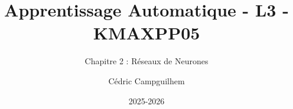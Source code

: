 \documentclass[10pt,handout]{beamer}  %
\title{Apprentissage Automatique - L3 - KMAXPP05}
\subtitle{Chapitre 2 : Réseaux de Neurones}
\author{Cédric Campguilhem}
\institute[]{
	Airbus Operations \\
	\href{mailto:cedric.campguilhem@airbus.com}{\texttt{cedric.campguilhem@airbus.com}}
}
\date{2025-2026}
\begin{document}
	
	\begin{frame}
		\titlepage
	\end{frame}
	
	
	
	
	
	
	
    
	
\end{document}
